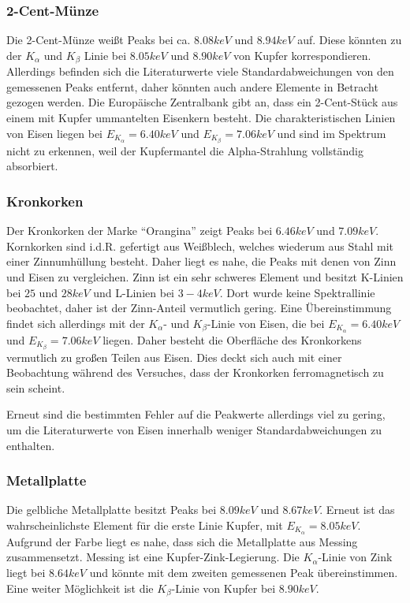 \documentclass{../Misc/MontavonLaTeX/Montavon}
\begin{document}
\subsubsection{2-Cent-Münze}
Die 2-Cent-Münze weißt Peaks bei ca. $8.08 \unit{keV}$ und $8.94 \unit{keV}$ auf. Diese könnten zu der $K_\alpha$ und $K_\beta$ Linie bei $8.05 \unit{keV}$ und $8.90 \unit{keV}$ von Kupfer\cite{atomdaten} korrespondieren. Allerdings befinden sich die Literaturwerte viele Standardabweichungen von den gemessenen Peaks entfernt, daher könnten auch andere Elemente in Betracht gezogen werden. Die Europäische Zentralbank gibt an, dass ein 2-Cent-Stück aus einem mit Kupfer ummantelten Eisenkern besteht\cite{muenzen}. Die charakteristischen Linien von Eisen liegen bei 	$E_{K_\alpha} = 6.40 \unit{keV}$ und $E_{K_\beta} = 7.06 \unit{keV}$\cite{nist} und sind im Spektrum nicht zu erkennen, weil der Kupfermantel die Alpha-Strahlung vollständig absorbiert.

\subsubsection{Kronkorken}
Der Kronkorken der Marke \enquote{Orangina} zeigt Peaks bei $6.46 \unit{keV}$ und $7.09 \unit{keV}$. Kornkorken sind i.d.R. gefertigt aus Weißblech, welches wiederum aus Stahl mit einer Zinnumhüllung besteht.
Daher liegt es nahe, die Peaks mit denen von Zinn und Eisen zu vergleichen. Zinn ist ein sehr schweres Element und besitzt K-Linien bei $25$ und $28 \unit{keV}$ und L-Linien bei $3-4 \unit{keV}$\cite{nist}. Dort wurde keine Spektrallinie beobachtet, daher ist der Zinn-Anteil vermutlich gering.
Eine Übereinstimmung findet sich allerdings mit der $K_\alpha$- und $K_\beta$-Linie von Eisen, die bei $E_{K_\alpha} = 6.40 \unit{keV}$ und $E_{K_\beta} = 7.06 \unit{keV}$ liegen. Daher besteht die Oberfläche des Kronkorkens vermutlich zu großen Teilen aus Eisen.
Dies deckt sich auch mit einer Beobachtung während des Versuches, dass der Kronkorken ferromagnetisch zu sein scheint.

Erneut sind die bestimmten Fehler auf die Peakwerte allerdings viel zu gering, um die Literaturwerte von Eisen innerhalb weniger Standardabweichungen zu enthalten.

\subsubsection{Metallplatte}
Die gelbliche Metallplatte besitzt Peaks bei $8.09 \unit{keV}$ und $8.67 \unit{keV}$. 
Erneut ist das wahrscheinlichste Element für die erste Linie Kupfer, mit $E_{K_\alpha} = 8.05 \unit{keV}$. 
Aufgrund der Farbe liegt es nahe, dass sich die Metallplatte aus Messing zusammensetzt. Messing ist eine Kupfer-Zink-Legierung. Die $K_\alpha$-Linie von Zink liegt bei $8.64 \unit{keV}$ und könnte mit dem zweiten gemessenen Peak übereinstimmen. Eine weiter Möglichkeit ist die $K_\beta$-Linie von Kupfer bei $8.90 \unit{keV}$.
\end{document}
